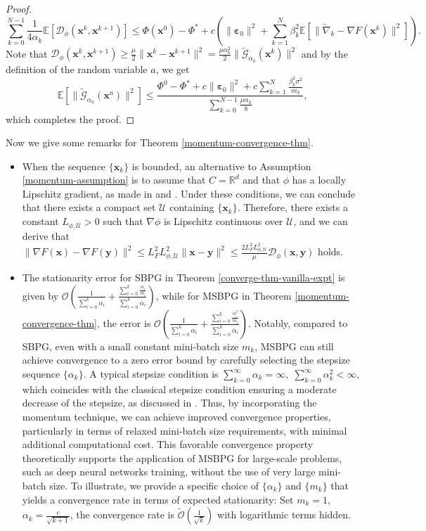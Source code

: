 \documentclass[twoside,11pt]{article}
\newcommand{\R}{\mathbb R}
\newcommand{\E}{\mathbb{E}}
\newcommand{\cD}{\mathcal D}
\newcommand{\cU}{\mathcal U}
\def\vx{{\bm{x}}}
\def\vy{{\bm{y}}}
\begin{document}
\begin{proof}
\[
\sum_{k=0}^{N-1}\frac{1}{4\alpha_k}\E[{\cD_\phi}({\vx^k},{\vx^{k+1}})]\leq\Phi(\vx^0)-\Phi^*+c\left(\|{\bm\varepsilon}_0\|^2+\sum_{k=1}^N\beta_k^2\E[\|\widetilde\nabla_k-\nabla F({\vx^k})\|^2]\right). 
\]
Note that ${\cD_\phi}({\vx^k},{\vx^{k+1}})\geq\frac{\mu}{2}\|{\vx^k}-{\vx^{k+1}}\|^2=\frac{\mu\alpha_k^2}{2}\|\widetilde{\mathcal{G}}_{\alpha_k}({\vx^k})\|^2$ and by the definition of the random variable $a$, we get
\[
\E[\|\widetilde{\mathcal G}_{\alpha_a}(\vx^{a})\|^2]\leq\frac{\Phi^0-\Phi^*+ {c\|\bm{\varepsilon}_0\|^2}
+c\sum_{k=1}^N\frac{\beta_k^2\sigma^2}{m_k}}{\sum_{k=0}^{N-1}\frac{\mu\alpha_k}{8}},
\]     
which completes the proof.
\end{proof}

\begin{remark}
Now we give some remarks for Theorem \ref{momentum-convergence-thm}.
\begin{itemize}
\item[1.] When the sequence $\{\vx_k\}$ is bounded, an alternative to Assumption \ref{momentum-assumption} is to assume that $C=\R^d$ and that $\phi$ has a locally Lipschitz gradient, as made in \cite[Theorem 4.1]{bolte2018first} and \cite[Theorem 4.7]{latafat2022bregman}. Under these conditions, we can conclude that there exists a compact set $\cU$ containing $\{\vx_k\}$. Therefore, there exists a constant $L_{\phi,\cU}>0$ such that $\nabla\phi$ is Lipschitz continuous over $\cU$, and we can derive that $\|\nabla F(\vx)-\nabla F(\vy)\|^2\leq L_F^2L_{\phi,\cU}^2\|\vx-\vy\|^2\leq\frac{2L_F^2L_{\phi,\cU}^2}{\mu}\cD_\phi(\vx,\vy)$ holds. 
\item[2.] {The stationarity error for SBPG in Theorem \ref{converge-thm-vanilla-expt} is given by $\mathcal{O}\left(\frac{1}{\sum_{i=0}^k\alpha_i}+\frac{\sum_{i=0}^k{\frac{\alpha_i}{m_i}}}{\sum_{i=0}^k\alpha_i}\right)$, while for MSBPG in Theorem \ref{momentum-convergence-thm}, the error is $\mathcal{O}\left(\frac{1}{\sum_{i=0}^k\alpha_i}+\frac{\sum_{i=0}^k{\frac{\alpha_i^2}{m_i}}}{\sum_{i=0}^k\alpha_i}\right)$. Notably, compared to SBPG, even with a small constant mini-batch size $m_k$, MSBPG can still achieve convergence to a zero error bound by carefully selecting the stepsize sequence $\{\alpha_k\}$. A typical stepsize condition is $\sum_{k=0}^\infty\alpha_k=\infty,\;\sum_{k=0}^\infty\alpha_k^2<\infty$, which coincides with the classical stepsize condition ensuring a moderate decrease of the stepsize, as discussed in \citep{bertsekas2000gradient}. Thus, by incorporating the momentum technique, we can achieve improved convergence properties, particularly in terms of relaxed mini-batch size requirements, with minimal additional computational cost. This favorable convergence property theoretically supports the application of MSBPG for large-scale problems, such as deep neural networks training, without the use of very large mini-batch size. To illustrate, we provide a specific choice of $\{\alpha_k\}$ and $\{m_k\}$ that yields a convergence rate in terms of expected stationarity: Set $m_k=1$, $\alpha_k=\frac{c}{\sqrt{k+1}}$, the convergence rate is $\widetilde{\mathcal{O}}\left(\frac{1}{\sqrt{k}}\right)$ with logarithmic terms hidden.}
\end{itemize}
\end{remark}
\end{document}
